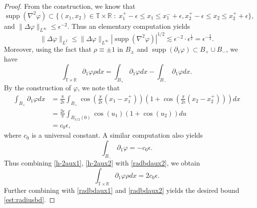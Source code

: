 \documentclass[10pt,a4paper]{amsart}
\DeclareMathOperator{\supp}{supp}
\newcommand{\R}{\mathbb{R}}
\newcommand{\T}{\mathbb{T}}
\newcommand{\eps}{\epsilon}
\newcommand{\p}{\partial}
\begin{document}
\begin{proof}
    From the construction, we know that $$\supp(\nabla^2\varphi) \subset \{(x_1,x_2 )\in \T\times \R\;:\; x_1^+ - \eps\le x_1 \le x_1^- + \eps, x_2^+ - \eps \le x_2 \le x_2^+ +\eps\},$$ and $\|\Delta \varphi\|_{L^\infty} \le \eps^{-2}$. Thus an elementary computation yields
    \begin{equation}\label{radbdaux2}
    \|\Delta\varphi\|_{L^2} \le \|\Delta \varphi\|_{L^\infty}|\supp(\nabla^2\varphi)|^{1/2} \lesssim \eps^{-2}\cdot \eps^{\frac12} = \eps^{-\frac32}.
    \end{equation}
    Moreover, using the fact that $\rho \equiv \pm1$ in $B_\pm$ and $\supp(\p_1 \varphi) \subset B_+ \cup B_-$, we have
    \begin{equation}\label{radbdaux3}
    \int_{\T \times \R}\p_1\varphi \rho dx = \int_{B_+}\p_1 \varphi dx - \int_{B_-}\p_1\varphi dx.
    \end{equation}
    By the construction of $\varphi$, we note that
    \begin{equation}\label{h-2aux1}
    \begin{split}
        \int_{B_+} \p_1\varphi dx &= \frac{\pi}{2\eps}\int_{B_+}\cos\left(\frac{\pi}{2\eps}(x_1 - x_1^+)\right)\left(1 + \cos\left(\frac{\pi}{2\eps}(x_2 - x_2^+)\right)\right) dx\\
        &= \frac{2\eps}{\pi}\int_{B_{\pi/2}(0)}\cos(u_1)(1+\cos(u_2)) du\\
        &= c_0\eps,
    \end{split}
    \end{equation}
    where $c_0$ is a universal constant. A similar computation also yields
    \begin{equation}\label{h-2aux2}
    \int_{B_-}\p_1\varphi = -c_0\eps.
    \end{equation}
    Thus combining \eqref{h-2aux1}, \eqref{h-2aux2} with \eqref{radbdaux2}, we obtain
    $$
    \int_{\T\times\R}\p_1\varphi \rho dx = 2c_0\eps.
    $$
    Further combining with \eqref{radbdaux1} and \eqref{radbdaux2} yields the desired bound \eqref{est:radiusbd}.
\end{proof}
\end{document}

